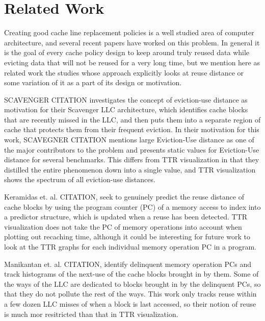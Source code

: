 \section{Related Work}

Creating good cache line replacement policies is a well
studied area of computer architecture, and several recent papers have
worked on this problem.  In general it is the goal of every cache
policy design to keep around truly reused data while evicting data
that will not be reused for a very long time, but we mention here as
related work the
studies whose approach explicitly looks at reuse distance or some
variation of it as a part of its design or motivation.

SCAVENGER CITATION investigates the concept of eviction-use distance
as motivation for their Scavenger LLC architecture, which identifies
cache blocks that are recently missed in the LLC, and then puts them
into a separate region of cache that protects them from their frequent
eviction.  In their motivation for this work, SCAVEGNER CITATION
mentions large Eviction-Use distance as one of the major contributors
to the problem and presents static values for Eviction-Use distance
for several benchmarks.  This differs from TTR visualization in that
they distilled the entire phenomenon down into a single value, and
TTR visualization shows the spectrum of all eviction-use distances.

Keramidas et. al. CITATION, seek to genuinely predict the reuse
distance of cache blocks by using the program counter (PC) of a memory
access to index into a predictor structure, which is updated when a
reuse has been detected.  TTR visualization does not take the PC of
memory operations into account when plotting out recaching time,
although it could be interesting for future work to look at the TTR
graphs for each individual memory operation PC in a program.

Manikantan et. al. CITATION, identify delinquent memory operation PCs
and track
histograms of the next-use of the cache blocks brought in by them.
Some of the ways of the LLC are dedicated to blocks brought in by the
delinquent PCs, so that they do not pollute the rest of the ways.
This work only tracks reuse within a few dozen LLC misses of when a
block is last accessed, so their notion of reuse is much mor
resitricted than that in TTR visualization.

